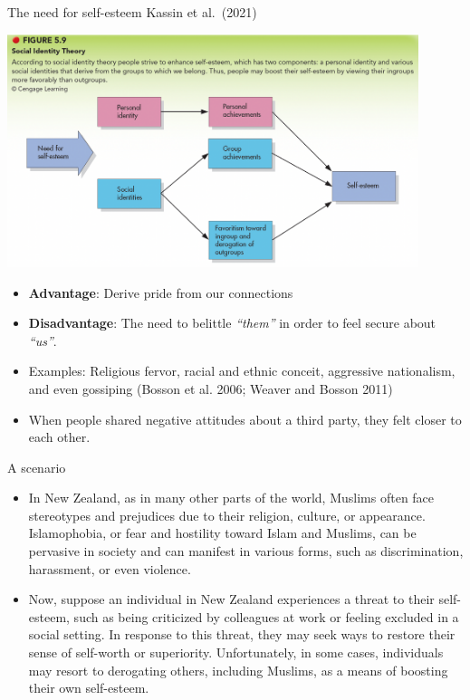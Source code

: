 \documentclass[
  ignorenonframetext,
  aspectratio=169,
]{beamer}
\providecommand{\tightlist}{%
  \setlength{\itemsep}{0pt}\setlength{\parskip}{0pt}}\usepackage{longtable,booktabs,array}
\begin{document}
\begin{frame}{The need for self-esteem}
\label{the-need-for-self-esteem}
Kassin et al.~(2021)

\includegraphics[width=0.9\textwidth,height=\textheight]{figs/selfesteem.png}
\end{frame}

\begin{frame}
\begin{itemize}[<+->]
\tightlist
\item
  \textbf{Advantage}: Derive pride from our connections
\item
  \textbf{Disadvantage}: The need to belittle \emph{``them''} in order
  to feel secure about \emph{``us''}.
\item
  Examples: Religious fervor, racial and ethnic conceit, aggressive
  nationalism, and even gossiping (Bosson et al. 2006; Weaver and Bosson
  2011)
\item
  When people shared negative attitudes about a third party, they felt
  closer to each other.
\end{itemize}
\end{frame}

\begin{frame}{A scenario}
\label{a-scenario}
\begin{itemize}[<+->]
\tightlist
\item
  In New Zealand, as in many other parts of the world, Muslims often
  face stereotypes and prejudices due to their religion, culture, or
  appearance. Islamophobia, or fear and hostility toward Islam and
  Muslims, can be pervasive in society and can manifest in various
  forms, such as discrimination, harassment, or even violence.
\item
  Now, suppose an individual in New Zealand experiences a threat to
  their self-esteem, such as being criticized by colleagues at work or
  feeling excluded in a social setting. In response to this threat, they
  may seek ways to restore their sense of self-worth or superiority.
  Unfortunately, in some cases, individuals may resort to derogating
  others, including Muslims, as a means of boosting their own
  self-esteem.
\end{itemize}
\end{frame}
\end{document}
